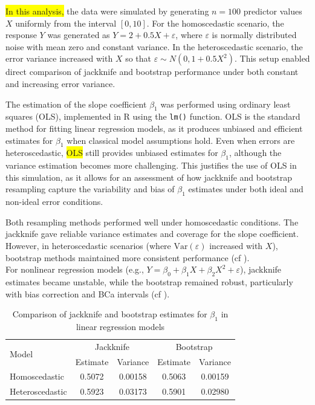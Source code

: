 \documentclass[aodsor,preprint]{imsart}
\numberwithin{equation}{section}
\theoremstyle{plain}
\begin{document}
 \colorbox{yellow}{In this analysis,} the data were simulated by generating $n = 100$ predictor values $X$ uniformly from the interval $[0, 10]$. For the homoscedastic scenario, the response $Y$ was generated as $Y = 2 + 0.5X + \varepsilon$, where $\varepsilon$ is normally distributed noise with mean zero and constant variance. In the heteroscedastic scenario, the error variance increased with $X$ so that $\varepsilon \sim N(0, 1 + 0.5 X^2)$. This setup enabled direct comparison of jackknife and bootstrap performance under both constant and increasing error variance.

The estimation of the slope coefficient $\beta_1$ was performed using ordinary least squares (OLS), implemented in R using the \texttt{lm()} function. OLS is the standard method for fitting linear regression models, as it produces unbiased and efficient estimates for $\beta_1$ when classical model assumptions hold. Even when errors are heteroscedastic, \colorbox{yellow}{OLS} still provides unbiased estimates for $\beta_1$, although the variance estimation becomes more challenging. This justifies the use of OLS in this simulation, as it allows for an assessment of how jackknife and bootstrap resampling capture the variability and bias of $\beta_1$ estimates under both ideal and non-ideal error conditions.

Both resampling methods performed well under homoscedastic conditions. The jackknife gave reliable variance estimates and coverage for the slope coefficient. However, in heteroscedastic scenarios (where \( \text{Var}(\varepsilon) \) increased with \( X \)), bootstrap methods maintained more consistent performance (cf \cite{shao1995jackknife,davison1997bootstrap}).\\

For nonlinear regression models (e.g., \( Y = \beta_0 + \beta_1 X + \beta_2 X^2 + \varepsilon \)), jackknife estimates became unstable, while the bootstrap remained robust, particularly with bias correction and BCa intervals (cf \cite{davison1997bootstrap,efron1993introduction}).\\

\begin{table}[h!]
\centering
\caption{Comparison of jackknife and bootstrap estimates for \(\beta_1\) in linear regression models}
\begin{tabular}{lcccc}
\hline
\multirow{2}{*}{Model} & \multicolumn{2}{c}{Jackknife} & \multicolumn{2}{c}{Bootstrap} \\
\cline{2-5}
& Estimate & Variance & Estimate & Variance \\
\hline
Homoscedastic   & 0.5072 & 0.00158 & 0.5063 & 0.00159 \\
Heteroscedastic & 0.5923 & 0.03173 & 0.5901 & 0.02980 \\
\hline
\end{tabular}
\label{tab:regression-est}
\end{table}
\end{document}
